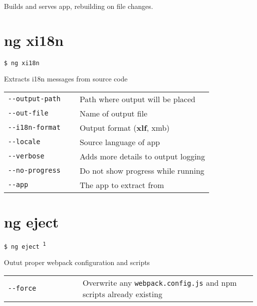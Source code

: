 \documentclass[8pt]{extarticle} %
\begin{document}
\begin{multicols}{3}
  \vspace{0.6ex}

  {\small Builds and serves app, rebuilding on file changes.}

\section*{ng xi18n}

  \vspace{1ex}
  {\tt \$ ng xi18n \itt{[options...]}}

  \vspace{0.6ex}

  {\small Extracts i18n messages from source code}

  \vspace{0.6ex}

  \begin{tabular}{L{0.35\linewidth} L{0.65\linewidth}}
    \tt -{}-output-path  & \small Path where output will be placed \\
    \tt -{}-out-file  & \small Name of output file \\
    \tt -{}-i18n-format  & \small Output format ({\bf xlf}, xmb)\\
    \tt -{}-locale  & \small Source language of app \\
    \tt -{}-verbose  & \small Adds more details to output logging \\
    \tt -{}-no-progress  & \small Do not show progress while running \\
    \tt -{}-app  & \small The app to extract from 
  \end{tabular}

\section*{ng eject}

  \vspace{1ex}
  {\tt \$ ng eject \textsuperscript{1} \itt{[options...]}}

  \vspace{0.6ex}

  {\small Outut proper webpack configuration and scripts}

  \vspace{0.6ex}

  \begin{tabular}{L{0.30\linewidth} L{0.70\linewidth}}
    \tt -{}-force & \small Overwrite any {\tt webpack.config.js} and npm scripts already existing
  \end{tabular}


\end{multicols}
\end{document}
